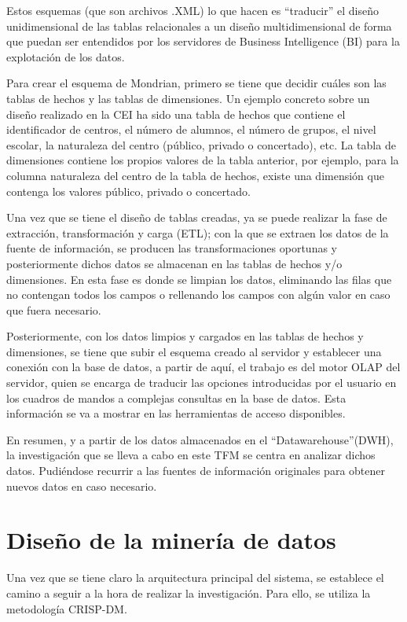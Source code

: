Estos esquemas (que son archivos .XML) lo que hacen es ``traducir'' el diseño unidimensional de las tablas relacionales a un diseño multidimensional de forma que puedan ser entendidos por los servidores de Business Intelligence (BI) para la explotación de los datos. 

Para crear el esquema de Mondrian, primero se tiene que decidir cuáles son las tablas de hechos y las tablas de dimensiones. Un ejemplo concreto sobre un diseño realizado en la CEI ha sido una tabla de hechos que contiene el identificador de centros, el número de alumnos, el número de grupos, el nivel escolar, la naturaleza del centro (público, privado o concertado), etc. La tabla de dimensiones contiene los propios valores de la tabla anterior, por ejemplo, para la columna naturaleza del centro de la tabla de hechos, existe una dimensión que contenga los valores público, privado o concertado.

Una vez que se tiene el diseño de tablas creadas, ya se puede realizar la fase de extracción, transformación y carga (ETL); con la que se extraen los datos de la fuente de información, se producen las transformaciones oportunas y posteriormente dichos datos se almacenan en las tablas de hechos y/o dimensiones. En esta fase es donde se limpian los datos, eliminando las filas que no contengan todos los campos o rellenando los campos con algún valor en caso que fuera necesario.

Posteriormente, con los datos limpios y cargados en las tablas de hechos y dimensiones, se tiene que subir el esquema creado al servidor y establecer una conexión con la base de datos, a partir de aquí, el trabajo es del motor OLAP del servidor, quien se encarga de traducir las opciones introducidas por el usuario en los cuadros de mandos a complejas consultas en la base de datos. Esta información se va a mostrar en las herramientas de acceso disponibles.

En resumen, y a partir de los datos almacenados en el ``Datawarehouse''(DWH), la investigación que se lleva a cabo en este TFM se centra en analizar dichos datos. Pudiéndose recurrir a las fuentes de información originales para obtener nuevos datos en caso necesario. 

\section{Diseño de la minería de datos}
Una vez que se tiene claro la arquitectura principal del sistema, se establece el camino a seguir a la hora de realizar la investigación. Para ello, se utiliza la metodología CRISP-DM. 

